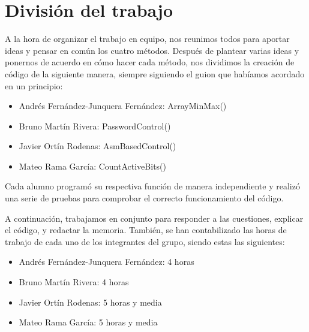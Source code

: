 \documentclass[11pt,a4paper]{article}
\begin{document}
\section{División del trabajo}
A la hora de organizar el trabajo en equipo, nos reunimos todos para aportar ideas y
pensar en común los cuatro métodos. Después de plantear varias ideas y ponernos de acuerdo 
en cómo hacer cada método, nos dividimos la creación de código de la siguiente manera, siempre 
siguiendo el guion que habíamos acordado en un principio:
\begin{itemize}
  \item Andrés Fernández-Junquera Fernández: ArrayMinMax()
  \item Bruno Martín Rivera: PasswordControl()
  \item Javier Ortín Rodenas: AsmBasedControl()
  \item Mateo Rama García: CountActiveBits()
\end{itemize}

\indent Cada alumno programó su respectiva función de manera independiente y realizó una serie de pruebas para comprobar
el correcto funcionamiento del código. 
\vspace{2ex}

A continuación, trabajamos en conjunto para responder a las cuestiones, explicar el código, y redactar la memoria. También, 
se han contabilizado las horas de trabajo de cada uno de los integrantes del grupo, siendo estas las siguientes:
\begin{itemize}
  \item Andrés Fernández-Junquera Fernández: 4 horas
  \item Bruno Martín Rivera: 4 horas
  \item Javier Ortín Rodenas: 5 horas y media
  \item Mateo Rama García: 5 horas y media
\end{itemize}
\end{document}
